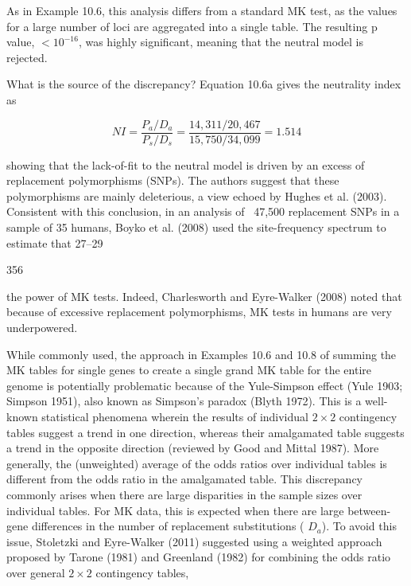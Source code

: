 \documentclass{article}
\begin{document}
As in Example 10.6, this analysis differs from a standard MK test, as the values for a large number of loci are aggregated into a single table. The resulting p value,  $ <10^{-16} $, was highly significant, meaning that the neutral model is rejected.

What is the source of the discrepancy? Equation 10.6a gives the neutrality index as

\begin{equation}
NI=\frac{P_{a}/D_{a}}{P_{s}/D_{s}}=\frac{14,311/20,467}{15,750/34,099}=1.514
\end{equation}

showing that the lack-of-fit to the neutral model is driven by an excess of replacement polymorphisms (SNPs). The authors suggest that these polymorphisms are mainly deleterious, a view echoed by Hughes et al. (2003). Consistent with this conclusion, in an analysis of ~47,500 replacement SNPs in a sample of 35 humans, Boyko et al. (2008) used the site-frequency spectrum to estimate that 27–29%

356

the power of MK tests. Indeed, Charlesworth and Eyre-Walker (2008) noted that because of excessive replacement polymorphisms, MK tests in humans are very underpowered.

While commonly used, the approach in Examples 10.6 and 10.8 of summing the MK tables for single genes to create a single grand MK table for the entire genome is potentially problematic because of the Yule-Simpson effect (Yule 1903; Simpson 1951), also known as Simpson's paradox (Blyth 1972). This is a well-known statistical phenomena wherein the results of individual  $ 2 \times 2 $ contingency tables suggest a trend in one direction, whereas their amalgamated table suggests a trend in the opposite direction (reviewed by Good and Mittal 1987). More generally, the (unweighted) average of the odds ratios over individual tables is different from the odds ratio in the amalgamated table. This discrepancy commonly arises when there are large disparities in the sample sizes over individual tables. For MK data, this is expected when there are large between-gene differences in the number of replacement substitutions ( $ D_{a} $). To avoid this issue, Stoletzki and Eyre-Walker (2011) suggested using a weighted approach proposed by Tarone (1981) and Greenland (1982) for combining the odds ratio over general  $ 2 \times 2 $ contingency tables,
\end{document}

